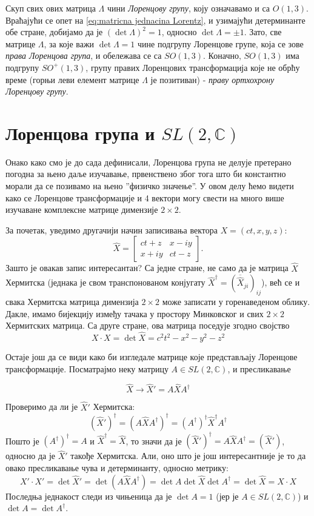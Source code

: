 \documentclass{report}
\theoremstyle{plain}
\theoremstyle{definition}
\begin{document}
Скуп свих ових матрица $\Lambda$ чини \emph{Лоренцову групу}, коју означавамо и са $O(1, 3)$. Враћајући се опет на \eqref{eq:matricna jednacina Lorentz}, и узимајући детерминанте обе стране, добијамо да је $(\det\Lambda)^2 = 1$, односно $\det\Lambda = \pm 1$. Зато, све матрице $\Lambda$, за које важи $\det\Lambda = 1$ чине подгрупу Лоренцове групе, која се зове \emph{права Лоренцова група}, и обележава се са $SO(1, 3)$. Коначно, $SO(1, 3)$ има подгрупу $SO^+(1, 3)$, групу правих Лоренцових трансформација које не обрћу време (горњи леви елемент матрице $\Lambda$ је позитиван) - \emph{праву ортхохрону Лоренцову групу}.

\section{Лоренцова група и $SL(2, \mathbb{C})$}
Онако како смо је до сада дефинисали, Лоренцова група не делује претерано погодна за њено даље изучавање, првенствено због тога што би константно морали да се позивамо на њено ''физичко значење''. У овом делу ћемо видети како се Лоренцове трансформације и 4 вектори могу свести на много више изучаване комплексне матрице димензије $2\times 2$.

За почетак, уведимо другачији начин записивања вектора $X = (ct, x, y, z)$:
$$\hat X = \begin{bmatrix}
            ct+z & x-iy \\
            x+iy & ct-z
           \end{bmatrix}.$$
Зашто је овакав запис интересантан? Са једне стране, не само да је матрица $\hat X$ Хермитска (једнака је свом транспонованом конјугату ${\hat X}^\dag = (\overline{\hat X}_{ji})_{ij}$), већ се и свака Хермитска матрица димензија $2\times 2$ може записати у горенаведеном облику. Дакле, имамо бијекцију између тачака у простору Минковског и свих $2\times 2$ Хермитских матрица. Са друге стране, ова матрица поседује згодно својство
$$X \cdot X = \det \hat X = c^2 t^2 - x^2 - y^2 - z^2$$

Остаје још да се види како би изгледале матрице које представљају Лоренцове трансформације. Посматрајмо неку матрицу $A\in SL(2, \mathbb{C})$, и пресликавање

\begin{equation}
\label{eq:spinor map1}
\hat X \to \hat X' = A\hat X A^\dag \tag{\maltese}
\end{equation}

Проверимо да ли је $\hat X'$ Хермитска:
$$(\hat X')^\dag = (A\hat X A^\dag)^\dag = (A^\dag)^\dag {\hat X}^\dag A^\dag$$
Пошто је $(A^\dag)^\dag = A$ и ${\hat X}^\dag = \hat X$, то значи да је $(\hat X')^\dag = A\hat X A^\dag = (\hat X')$, односно да је $\hat X'$ такође Хермитска. Али, оно што је још интересантније је то да овако пресликавање чува и детерминанту, односно метрику:
$$X'\cdot X' = \det \hat X' = \det(A\hat X A^\dag) = \det A \det \hat X \det A^\dag = \det \hat X = X\cdot X$$
Последња једнакост следи из чињеница да је $\det A = 1$ (јер је $A\in SL(2, \mathbb{C})$) и $\det A = \det A^\dag$.
\end{document}
